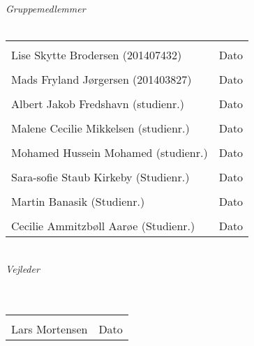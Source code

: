 \begin{vplace}[0.6]
{\large \textit{Gruppemedlemmer}}
\\
\\

\noindent \begin{tabular}{ll}
	\makebox[3.0in]{\hrulefill} & \makebox[1.5in]{\hrulefill}\\
	Lise Skytte Brodersen (201407432) & Dato\\[7ex]%
	\makebox[3in]{\hrulefill} & \makebox[1.5in]{\hrulefill}\\
	Mads Fryland J\o rgersen (201403827) & Dato\\[7ex]
	\makebox[3in]{\hrulefill} & \makebox[1.5in]{\hrulefill}\\
	Albert Jakob Fredshavn (studienr.) & Dato\\[7ex]
	\makebox[3in]{\hrulefill} & \makebox[1.5in]{\hrulefill}\\
	Malene Cecilie Mikkelsen (studienr.) & Dato\\[7ex]
	\makebox[3in]{\hrulefill} & \makebox[1.5in]{\hrulefill}\\
	Mohamed Hussein Mohamed (studienr.) & Dato\\[7ex]
	\makebox[3in]{\hrulefill} & \makebox[1.5in]{\hrulefill}\\
	Sara-sofie Staub Kirkeby (Studienr.) & Dato\\[7ex]
	\makebox[3in]{\hrulefill} & \makebox[1.5in]{\hrulefill}\\
	Martin Banasik (Studienr.) & Dato\\[7ex]
	\makebox[3in]{\hrulefill} & \makebox[1.5in]{\hrulefill}\\
	Cecilie Ammitzb\o ll Aar\o e (Studienr.) & Dato\\[7ex]
	
\end{tabular}
\\
{\large \textit{Vejleder}}
\\
\\
\\
\noindent \begin{tabular}{ll}
	\makebox[3.0in]{\hrulefill} & \makebox[1.5in]{\hrulefill}\\
	Lars Mortensen & Dato\\[8ex]
\end{tabular}
\end{vplace}
